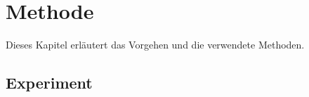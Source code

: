 \chapter{Methode}\label{ch:Methode}


Dieses Kapitel erläutert das Vorgehen und die verwendete Methoden.



\section{Experiment}\label{sec:experiment}


